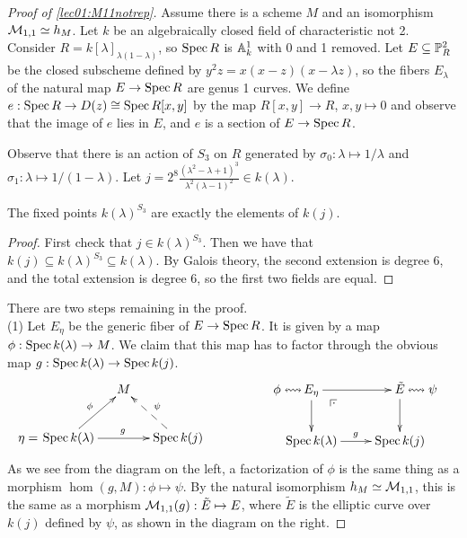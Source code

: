 \begin{proof}[Proof of \ref{lec01:M11notrep}]
  Assume there is a scheme $M$ and an isomorphism $\M_{1,1}\simeq h_M$. Let $k$ be an
  algebraically closed field of characteristic not 2. Consider
  $R=k[\lambda]_{\lambda(1-\lambda)}$, so $\spec R$ is $\AA^1_k$ with 0 and 1 removed.
  Let $E\subseteq \PP^2_R$ be the closed subscheme defined by $y^2z=x(x-z)(x-\lambda
  z)$, so the fibers $E_\lambda$ of the natural map $E\to \spec R$ are genus 1 curves.
  We define $e:\spec R\to D(z)\cong \spec R[x,y]$ by the map $R[x,y]\to R$, $x,y\mapsto
  0$ and observe that the image of $e$ lies in $E$, and $e$ is a section of $E\to \spec
  R$.

  Observe that there is an action of $S_3$ on $R$ generated by $\sigma_0:\lambda\mapsto
  1/\lambda$ and $\sigma_1:\lambda\mapsto 1/(1-\lambda)$. Let
  $j=2^8 \frac{(\lambda^2-\lambda+1)^3}{\lambda^2(\lambda-1)^2}\in k(\lambda)$.
  \begin{lemma}
    The fixed points $k(\lambda)^{S_3}$ are exactly the elements of $k(j)$.
  \end{lemma}
  \begin{proof}
    First check that $j\in k(\lambda)^{S_3}$. Then we have that $k(j)\subseteq
    k(\lambda)^{S_3}\subseteq k(\lambda)$. By Galois theory, the second extension is
    degree 6, and the total extension is degree 6, so the first two fields are equal.
  \renewcommand{\qedsymbol}{$\Box_\text{Lemma}$}
  \end{proof}
  There are two steps remaining in the proof.\\
  (1) Let $E_\eta$ be the generic fiber of $E\to \spec R$. It is given by a map $\phi:\spec
  k(\lambda)\to M$. We claim that this map has to factor through the obvious map
  $g:\spec k(\lambda)\to \spec k(j)$.
  \[\xymatrix@C-1pc{
    & M \\
   \llap{$\eta =\:$}\spec k(\lambda) \ar[rr]^g \ar[ur]^\phi & & \spec k(j) \ar@{-->}[ul]_{\psi}
  }\qquad\qquad \qquad
  \xymatrix{
   \llap{$\phi \leftrightsquigarrow$\,} E_\eta \ar[r] \ar@{}[dr]|(.25)\pb \ar[d] & \tilde E \rlap{$\:\leftrightsquigarrow \psi$} \ar[d]\\
   \spec k(\lambda) \ar[r]^g &\spec k(j)
  }\]
   As we see from the diagram on the left, a factorization of $\phi$ is the same thing
  as a morphism $\hom(g,M):\phi\mapsto \psi$. By the natural isomorphism $h_M\simeq
  \M_{1,1}$, this is the same as a morphism $\M_{1,1}(g): \tilde E\mapsto E$, where $\tilde
  E$ is the elliptic curve over $k(j)$ defined by $\psi$, as shown in the diagram on the
  right.


\end{proof}
